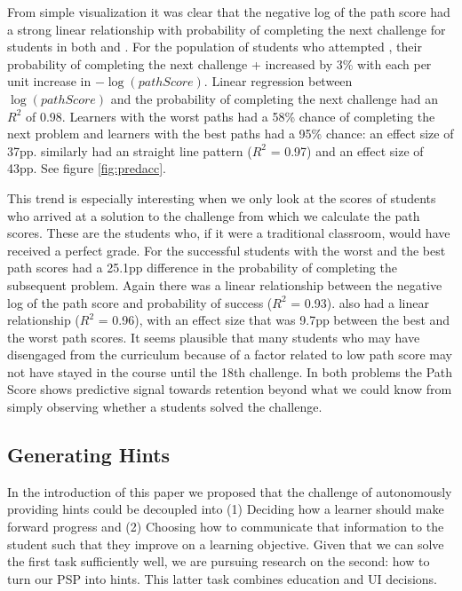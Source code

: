 From simple visualization it was clear that the negative log of the path score had a strong linear relationship with probability of completing the next challenge for students in both \Pa and \Pb\hspace{-0.5mm}. For the population of students who attempted \Pa, their probability of completing the next challenge \Pa\hspace{-0.5mm}+ increased by 3\% with each per unit increase in $-\log(pathScore)$. Linear regression between $\log(pathScore)$ and the probability of completing the next challenge had an $R^2$ of 0.98. Learners with the worst paths had a 58\% chance of completing the next problem and learners with the best paths had a 95\% chance: an effect size of 37pp. \Pb similarly had an straight line pattern ($R^2$ = 0.97) and an effect size of 43pp. See figure \ref{fig:predacc}.

This trend is especially interesting when we only look at the scores of students who arrived at a solution to the challenge from which we calculate the path scores. These are the students who, if it were a traditional classroom, would have received a perfect grade. For \Pa the successful students with the worst and the best path scores had a 25.1pp difference in the probability of completing the subsequent problem. Again there was a linear relationship between the negative log of the path score and probability of success ($R^2$ = 0.93). \Pb also had a linear relationship ($R^2$ = 0.96), with an effect size that was 9.7pp between the best and the worst path scores. It seems plausible that many students who may have disengaged from the curriculum because of a factor related to low path score may not have stayed in the course until the 18th challenge. In both problems the Path Score shows predictive signal towards retention beyond what we could know from simply observing whether a students solved the challenge.

\subsection{Generating Hints}

In the introduction of this paper we proposed that the challenge of autonomously providing hints could be decoupled into (1) Deciding how a learner should make forward progress and (2) Choosing how to communicate that information to the student such that they improve on a learning objective. Given that we can solve the first task sufficiently well, we are  pursuing research on the second: how to turn our PSP into hints. This latter task combines education and UI decisions.

